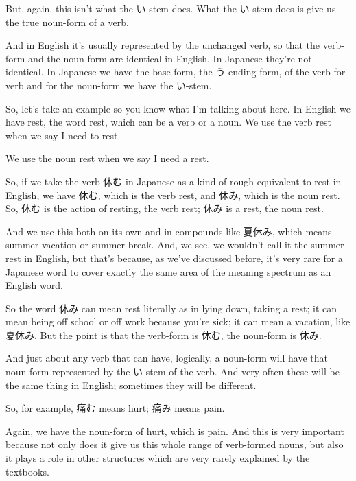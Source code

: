 But, again, this isn't what the い-stem does. What the い-stem does is give us the true noun-form of a verb.

And in English it's usually represented by the unchanged verb, so that the verb-form and the noun-form are identical in English. In Japanese they're not identical. In Japanese we have the base-form, the う-ending form, of the verb for verb and for the noun-form we have the い-stem.

So, let's take an example so you know what I'm talking about here. In English we have rest, the word rest, which can be a verb or a noun. We use the verb rest when we say I need to rest.

We use the noun rest when we say I need a rest.

{}

So, if we take the verb 休む in Japanese as a kind of rough equivalent to rest in English, we have 休む, which is the verb rest, and 休み, which is the noun rest. So, 休む is the action of resting, the verb rest; 休み is a rest, the noun rest.

And we use this both on its own and in compounds like 夏休み, which means summer vacation or summer break. And, we see, we wouldn't call it the summer rest in English, but that's because, as we've discussed before, it's very rare for a Japanese word to cover exactly the same area of the meaning spectrum as an English word.

So the word 休み can mean rest literally as in lying down, taking a rest; it can mean being off school or off work because you're sick; it can mean a vacation, like 夏休み. But the point is that the verb-form is 休む, the noun-form is 休み.

{}

And just about any verb that can have, logically, a noun-form will have that noun-form represented by the い-stem of the verb. And very often these will be the same thing in English; sometimes they will be different.

So, for example, 痛む means hurt; 痛み means pain.

{}

Again, we have the noun-form of hurt, which is pain. And this is very important because not only does it give us this whole range of verb-formed nouns, but also it plays a role in other structures which are very rarely explained by the textbooks.

